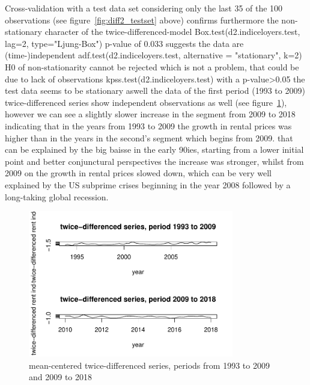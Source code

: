 \documentclass[11pt,a4paper]{article}
\begin{document}
Cross-validation with a test data set considering only the last 35 of the 100 observations (see figure~\ref{fig:diff2_testset} above) confirms furthermore the non-stationary character of the twice-differenced-model 
Box.test(d2.indiceloyers.test, lag=2, type="Ljung-Box") p-value of 0.033 suggests the data are (time-)independent
adf.test(d2.indiceloyers.test, alternative = "stationary", k=2)  H0 of non-stationarity cannot be rejected which is not a problem, that could be due to lack of observations
kpss.test(d2.indiceloyers.test)  with a p-value>0.05 the test data seems to be stationary aswell
the data of the first period (1993 to 2009) twice-differenced series show independent observations as well (see figure~\ref{fig:diff2_test_train}), however we can see a slightly slower increase in the segment from 2009 to 2018 indicating that in the years from 1993 to 2009 the growth in rental prices was higher than in the years in the second's segment which begins from 2009. that can be explained by the big baisse in the early 90ies, starting from a lower initial point and better conjunctural perspectives the increase was stronger, whilst from 2009 on the growth in rental prices slowed down, which can be very well explained by the US subprime crises beginning in the year 2008 followed by a long-taking global recession.

\begin{figure}
    \centering
    \includegraphics[angle=0,width=0.8\textwidth]{diff2_test_train}
    \caption{mean-centered twice-differenced series, periods from 1993 to 2009 and 2009 to 2018}
    \label{fig:diff2_test_train}
\end{figure}
\end{document}

